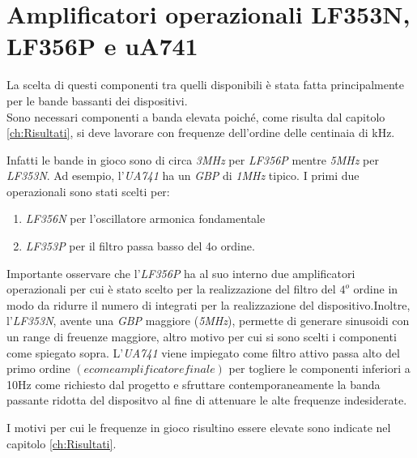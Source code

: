 \documentclass[titlepage]{report}
\begin{document}
	
\section{Amplificatori operazionali LF353N, LF356P e uA741}
\label{sec:OpAmp}
	La scelta di questi componenti tra quelli disponibili è stata fatta principalmente per le bande bassanti dei dispositivi.
	\\ Sono necessari componenti a banda elevata poiché, come risulta dal capitolo \ref{ch:Risultati}, si deve lavorare con frequenze dell'ordine delle centinaia di kHz.
	
	 \noindent Infatti le bande in gioco sono di circa \textit{3MHz} per \textit{LF356P} mentre \textit{5MHz} per \textit{LF353N}. Ad esempio, l'\textit{UA741} ha un \textit{GBP} di \textit{1MHz} tipico. I primi due operazionali sono stati scelti per:
	
	\begin{enumerate}
		\item \textit{LF356N} per l'oscillatore armonica fondamentale 
		\item \textit{LF353P} per il filtro passa basso del 4o ordine. 
	\end{enumerate}
	
	
	\noindent Importante osservare che l'\textit{LF356P} ha al suo interno due amplificatori operazionali per cui è stato scelto per la realizzazione del filtro del $4^{o}$ ordine in modo da ridurre il numero di integrati per la realizzazione del dispositivo.Inoltre, l'\textit{LF353N}, avente una \textit{GBP} maggiore (\textit{5MHz}), permette di generare sinusoidi con un range di freuenze maggiore, altro motivo per cui si sono scelti i componenti come spiegato sopra.
	L'\textit{UA741} viene impiegato come filtro attivo passa alto del primo ordine $(e come amplificatore finale)$ per togliere le componenti inferiori a 10Hz come richiesto dal progetto e sfruttare contemporaneamente la banda passante ridotta del dispositvo al fine di attenuare le alte frequenze indesiderate.

	\noindent I motivi per cui le frequenze in gioco risultino essere elevate sono indicate nel capitolo \ref{ch:Risultati}.

	
\end{document}

